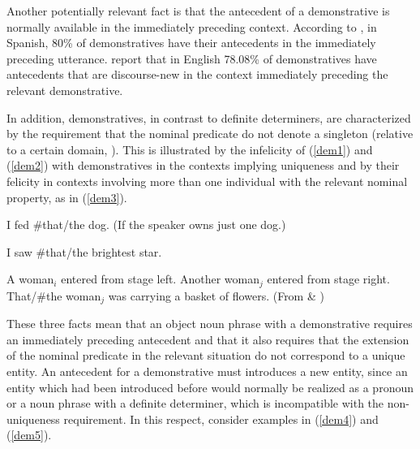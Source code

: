 \documentclass[output=paper,modfonts,nonflat]{langsci/langscibook}
\begin{document}

Another potentially relevant fact is that the antecedent of a demonstrative is normally available in the immediately preceding context. According to \citet[180]{Zulaica:2011}, in Spanish, 80\% of demonstratives have their antecedents in the immediately preceding utterance. \citet[204]{StevensLight:2013} report that in English 78.08\% of demonstratives have antecedents that are discourse-new in the context immediately preceding the relevant demonstrative.

In addition, demonstratives, in contrast to definite determiners, are characterized by the requirement that the nominal predicate do not denote a singleton (relative to a certain domain, \citet{Corblin:1987}). This is illustrated by the infelicity of (\ref{dem1}) and (\ref{dem2}) with demonstratives in the contexts implying uniqueness and by their felicity in contexts involving more than one individual with the relevant nominal property, as in (\ref{dem3}).

\ea
I fed \#that/the dog. (If the speaker owns just one dog.)\label{dem1}
\z

\ea
I saw \#that/the brightest star.\label{dem2}
\z

\ea
 A woman$_{i}$ entered from stage left. Another woman$_{j}$ entered from stage right. That/\#the woman$_{j}$ was carrying a basket of flowers. \label{dem3} \hfill (From \citealt{Roberts:2002} \& \citealt[74]{Wolter:2006})
 \z

These three facts mean that an object noun phrase with a demonstrative requires an immediately preceding antecedent and that it also requires that the extension of the nominal predicate in the relevant situation do not correspond to a unique entity. An antecedent for a demonstrative must introduces a new entity, since an entity which had been introduced before would normally be realized as a pronoun or a noun phrase with a definite determiner, which is incompatible with the non-uniqueness requirement. In this respect, consider examples in (\ref{dem4}) and (\ref{dem5}).

\end{document}
